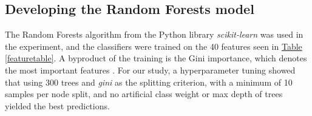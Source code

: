 \documentclass[11pt, review]{elsarticle} %
\begin{document}
\subsection{Developing the Random Forests model}

The Random Forests \citep{breiman} algorithm from the Python library \textit{scikit-learn} \citep{scikit-learn} was used in the experiment, and the classifiers were trained on the 40 features seen in \hyperref[featuretable]{Table} \ref{featuretable}. A byproduct of the training is the Gini importance, which denotes the most important features \citep{gini}. For our study, a hyperparameter tuning showed that using 300 trees and \textit{gini} as the splitting criterion, with a minimum of 10 samples per node split, and no artificial class weight or max depth of trees yielded the best predictions. 
\end{document}
